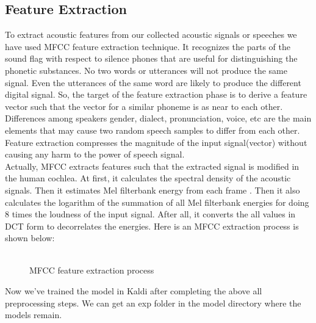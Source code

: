 \documentclass{standalone}
\begin{document}
\subsection{Feature Extraction}
To extract acoustic features from our collected acoustic signals or speeches we have used MFCC feature extraction technique.
It recognizes the parts of the sound flag with respect to silence phones that are useful for distinguishing the phonetic substances. No two words or utterances will not produce the same signal. Even the utterances of the same word are likely to produce the different digital signal. So, the target of the feature extraction phase is to derive a feature vector such that the vector for a similar phoneme is as near to each other.
Differences among speakers gender, dialect, pronunciation, voice, etc are the main elements that may cause two random speech samples to differ from each other. Feature extraction compresses the magnitude of the input signal(vector) without causing any harm to the power of speech signal.\\
Actually, MFCC extracts features such that the extracted signal is modified in the human cochlea. At first, it calculates the spectral density of the acoustic signals. Then it estimates Mel filterbank energy from each frame \cite{tiwari2010mfcc}. Then it also calculates the logarithm of the summation of all Mel filterbank energies for doing 8 times the loudness of the input signal. After all, it converts the all values in DCT form to decorrelates the energies. Here is an MFCC extraction process is shown below:
\\
\\
   \begin{figure}[h]
 \centering
 \caption{MFCC feature extraction process}
\label{fig:MFCC}
\end{figure}

 Now we've trained the model in Kaldi after completing the above all preprocessing steps. We can get an exp folder in the model directory where the models remain.

    
\end{document}
